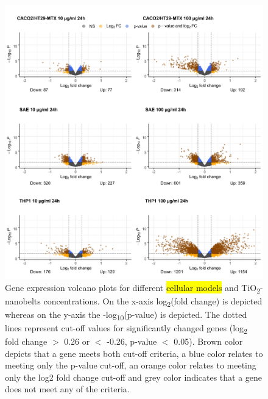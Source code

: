 \documentclass[ijms,article,submit,moreauthors,pdftex]{Definitions/mdpi}
\begin{document}
\begin{figure}[ht!]
\includegraphics[width=0.9\linewidth]{fig1.png}
  \caption{Gene expression volcano plots for different \hl{cellular models} and TiO\textsubscript{2}-nanobelts concentrations.
   On the x-axis log\textsubscript{2}(fold change) is depicted whereas on the y-axis the -log\textsubscript{10}(p-value) is depicted. The dotted lines represent cut-off values for significantly changed genes (log\textsubscript{2} fold change $>$ 0.26 or $<$ -0.26, p-value $<$ 0.05). Brown color depicts that a gene meets both cut-off criteria, a blue color relates to meeting only the p-value cut-off, an orange color relates to meeting only the log2 fold change cut-off and grey color indicates that a gene does not meet any of the criteria.}
\label{fig:fig1}
\end{figure}
\end{document}
